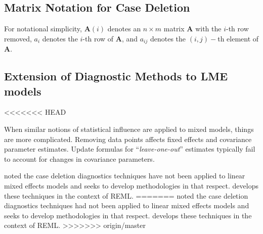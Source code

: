 \documentclass[12pt, a4paper]{article}
\begin{document}
\subsection{Matrix Notation for Case Deletion} %


For notational simplicity, $\boldsymbol{A}(i)$ denotes an $n \times m$ matrix $\boldsymbol{A}$ with the $i$-th row
removed, $a_i$ denotes the $i$-th row of $\boldsymbol{A}$, and $a_{ij}$ denotes the $(i, j)-$th element of $\boldsymbol{A}$.
%



\subsection{Extension of Diagnostic Methods to LME models}

<<<<<<< HEAD

When similar notions of statistical influence are applied to mixed models,
things are more complicated. Removing data points affects fixed effects and covariance parameter estimates.
Update formulas for “\textit{leave-one-out}” estimates typically fail to account for changes in covariance
parameters. 
%
%

\citet{Christiansen} noted the case deletion diagnostics techniques have not been applied to linear mixed effects models and seeks to develop methodologies in that respect. \citet{Christiansen} develops these techniques in the context of REML.
=======
\citet{CPJ} noted the case deletion diagnostics techniques had not been applied to linear mixed effects models and seeks to develop methodologies in that respect. \citet{CPJ} develops these techniques in the context of REML.
>>>>>>> origin/master
\end{document}
